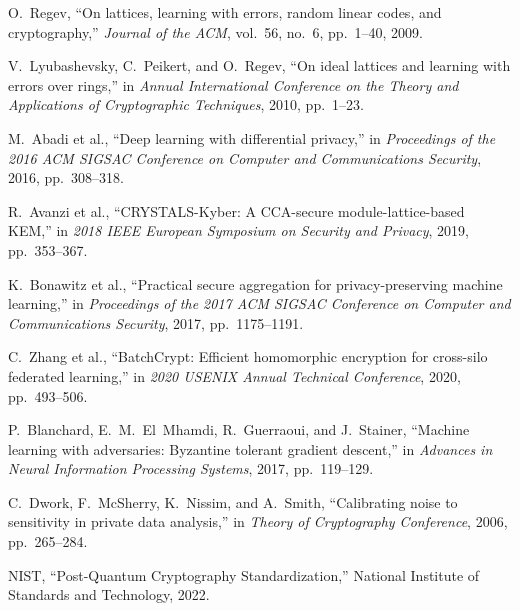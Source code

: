 \documentclass[journal,onecolumn]{IEEEtran}
\begin{document}
\begin{thebibliography}{9}

O.~Regev, ``On lattices, learning with errors, random linear codes, and cryptography,'' \emph{Journal of the ACM}, vol.~56, no.~6, pp.~1--40, 2009.

V.~Lyubashevsky, C.~Peikert, and O.~Regev, ``On ideal lattices and learning with errors over rings,'' in \emph{Annual International Conference on the Theory and Applications of Cryptographic Techniques}, 2010, pp.~1--23.

M.~Abadi et al., ``Deep learning with differential privacy,'' in \emph{Proceedings of the 2016 ACM SIGSAC Conference on Computer and Communications Security}, 2016, pp.~308--318.

R.~Avanzi et al., ``CRYSTALS-Kyber: A CCA-secure module-lattice-based KEM,'' in \emph{2018 IEEE European Symposium on Security and Privacy}, 2019, pp.~353--367.

K.~Bonawitz et al., ``Practical secure aggregation for privacy-preserving machine learning,'' in \emph{Proceedings of the 2017 ACM SIGSAC Conference on Computer and Communications Security}, 2017, pp.~1175--1191.

C.~Zhang et al., ``BatchCrypt: Efficient homomorphic encryption for cross-silo federated learning,'' in \emph{2020 USENIX Annual Technical Conference}, 2020, pp.~493--506.

P.~Blanchard, E.~M.~El~Mhamdi, R.~Guerraoui, and J.~Stainer, ``Machine learning with adversaries: Byzantine tolerant gradient descent,'' in \emph{Advances in Neural Information Processing Systems}, 2017, pp.~119--129.

C.~Dwork, F.~McSherry, K.~Nissim, and A.~Smith, ``Calibrating noise to sensitivity in private data analysis,'' in \emph{Theory of Cryptography Conference}, 2006, pp.~265--284.

NIST, ``Post-Quantum Cryptography Standardization,'' National Institute of Standards and Technology, 2022.

\end{thebibliography}
\end{document}
